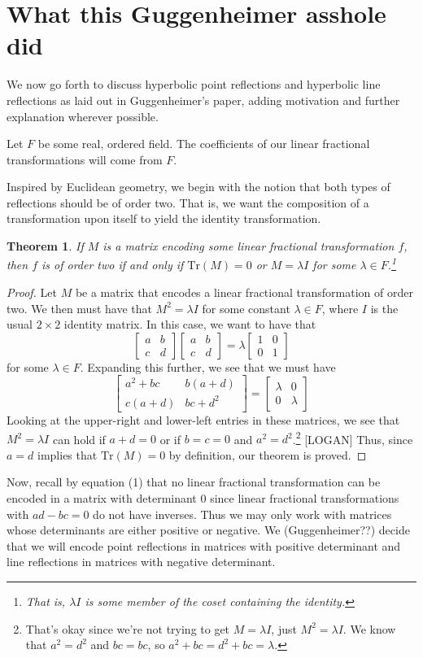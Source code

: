 \documentclass[12pt]{article}
\newcommand{\Tr}{\text{Tr}}
\newcommand{\lftmat}[4]{\begin{bmatrix} {#1} & {#2} \\ {#3} & {#4} \end{bmatrix}}
\newcommand{\stanlftmat}{\lftmat{a}{b}{c}{d}}
\theoremstyle{plain}
\newtheorem{theorem}{Theorem}[section]
\theoremstyle{definition}
\begin{document}
\[\]\section{What this Guggenheimer asshole did}

We now go forth to discuss hyperbolic point reflections and hyperbolic line reflections as laid out in Guggenheimer's paper, adding motivation and further explanation wherever possible. 

Let $F$ be some real, ordered field. The coefficients of our linear fractional transformations will come from $F$.

Inspired by Euclidean geometry, we begin with the notion that both types of reflections should be of order two. That is, we want the composition of a transformation upon itself to yield the identity transformation. 

\begin{theorem}
If $M$ is a matrix encoding some linear fractional transformation $f$, then $f$ is of order two if and only if $\Tr(M) = 0$ or $M = \lambda I$ for some $\lambda \in F$.\footnote{That is, $\lambda I$ is some member of the coset containing the identity.}
\end{theorem}

\begin{proof}
 Let $M$ be a matrix that encodes a linear fractional transformation of order two. We then must have that $M^2 = \lambda I$ for some constant $\lambda \in F$, where $I$ is the usual $2 \times 2$ identity matrix. In this case, we want to have that 
	\[
		\stanlftmat \stanlftmat = \lambda \lftmat{1}{0}{0}{1}
	\]
for some $\lambda \in F$. Expanding this further, we see that we must have 
	\[
		\lftmat{a^2 + bc}{b(a+d)}{c(a+d)}{bc+d^2} =  \lftmat{\lambda}{0}{0}{\lambda}
	\]
Looking at the upper-right and lower-left entries in these matrices, we see that $M^2 = \lambda I$ can hold if $a + d = 0$ or if $b = c = 0$ and $a^2 = d^2$.\footnote{That's okay since we're not trying to get $M = \lambda I$, just $M^2 = \lambda I$. We know that $a^2 = d^2$ and $bc = bc$, so $a^2 + bc = d^2 + bc = \lambda$.} [LOGAN] Thus, since $a = d$ implies that $\Tr(M) = 0$ by definition, our theorem is proved.
\end{proof}


Now, recall by equation (1) that no linear fractional transformation can be encoded in a matrix with determinant 0 since linear fractional transformations with $ad - bc = 0$ do not have inverses. Thus we may only work with matrices whose determinants are either positive or negative. We (Guggenheimer??) decide that we will encode point reflections in matrices with positive determinant and line reflections in matrices with negative determinant. 
\end{document}
